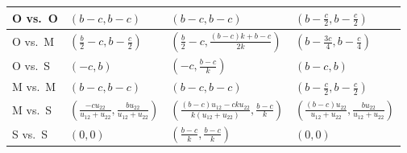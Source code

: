 \documentclass[11pt,reqno]{amsart}
\newcommand{\bn}{b}
\newcommand{\cs}{c}
\newcommand{\vh}{k}
\begin{document}
\begin{table}[]
\begin{tabular}{@{}llll@{}}
O vs.~O              & $(\bn -\cs, \bn -\cs)$                                                                                                           & $(\bn -\cs, \bn -\cs)$                                                                                                              & $(\bn -\frac{\cs}{2}, \bn - \frac{\cs}{2})$                                                                                         \\ \midrule
O vs.~M              & $(\frac{\bn}{2} - \cs, \bn - \frac{\cs}{2})$                                                                                     & $(\frac{\bn}{2} - \cs,\frac{(\bn - \cs)\vh+\bn - \cs}{2\vh})$                                                                       & $(\bn -\frac{3\cs}{4},\bn -\frac{\cs}{4})$                                                                                          \\ \midrule
O vs.~S              & $(-\cs, \bn)$                                                                                                                    & $(- \cs, \frac{\bn - \cs}{\vh})$                                                                                                    & $(\bn -\cs, \bn)$                                                                                                                   \\ \midrule
M vs.~M              & $(\bn -\cs, \bn -\cs)$                                                                                                           & $(\bn -\cs, \bn -\cs)$                                                                                                              & $(\bn -\frac{\cs}{2}, \bn - \frac{\cs}{2})$                                                                                         \\ \midrule
M vs.~S              & $(\frac{-\cs u_{22}}{u_{12}+u_{22}},\frac{\bn u_{22}}{u_{12}+u_{22}})$                                                           & $(\frac{(\bn - \cs)u_{12} - \cs\vh u_{22}}{\vh(u_{12}+u_{22})},\frac{\bn - \cs}{\vh})$                                              & $(\frac{(\bn-\cs) u_{22}}{u_{12}+u_{22}},\frac{\bn u_{22}}{u_{12}+u_{22}})$                                                         \\ \midrule
S vs.~S              & $(0,0)$                                                                                                                          & $(\frac{\bn - \cs}{\vh}, \frac{\bn - \cs}{\vh})$                                                                                    & $(0,0)$                                                                                                                             \\ \bottomrule
\end{tabular}
\end{table}
\end{document}
